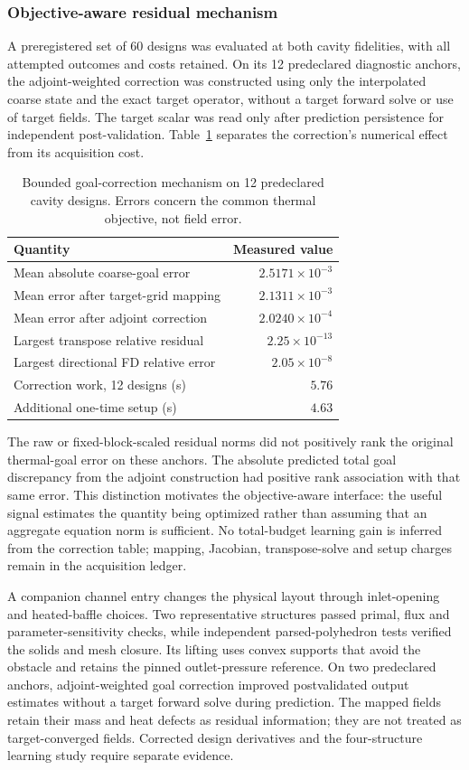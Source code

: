 \subsubsection{Objective-aware residual mechanism}
A preregistered set of 60 designs was evaluated at both cavity fidelities, with all attempted outcomes and costs retained. On its 12 predeclared diagnostic anchors, the adjoint-weighted correction was constructed using only the interpolated coarse state and the exact target operator, without a target forward solve or use of target fields. The target scalar was read only after prediction persistence for independent post-validation. Table~\ref{tab:goal-correction} separates the correction's numerical effect from its acquisition cost.
\begin{table}[t]
\centering
\caption{Bounded goal-correction mechanism on 12 predeclared cavity designs. Errors concern the common thermal objective, not field error.}
\label{tab:goal-correction}
\begin{tabular}{lr}
\toprule
Quantity & Measured value \\
\midrule
Mean absolute coarse-goal error & $2.5171\times10^{-3}$ \\
Mean error after target-grid mapping & $2.1311\times10^{-3}$ \\
Mean error after adjoint correction & $2.0240\times10^{-4}$ \\
Largest transpose relative residual & $2.25\times10^{-13}$ \\
Largest directional FD relative error & $2.05\times10^{-8}$ \\
Correction work, 12 designs (s) & $5.76$ \\
Additional one-time setup (s) & $4.63$ \\
\bottomrule
\end{tabular}
\end{table}
The raw or fixed-block-scaled residual norms did not positively rank the original thermal-goal error on these anchors. The absolute predicted total goal discrepancy from the adjoint construction had positive rank association with that same error. This distinction motivates the objective-aware interface: the useful signal estimates the quantity being optimized rather than assuming that an aggregate equation norm is sufficient. No total-budget learning gain is inferred from the correction table; mapping, Jacobian, transpose-solve and setup charges remain in the acquisition ledger.

A companion channel entry changes the physical layout through inlet-opening and heated-baffle choices. Two representative structures passed primal, flux and parameter-sensitivity checks, while independent parsed-polyhedron tests verified the solids and mesh closure. Its lifting uses convex supports that avoid the obstacle and retains the pinned outlet-pressure reference. On two predeclared anchors, adjoint-weighted goal correction improved postvalidated output estimates without a target forward solve during prediction. The mapped fields retain their mass and heat defects as residual information; they are not treated as target-converged fields. Corrected design derivatives and the four-structure learning study require separate evidence.

